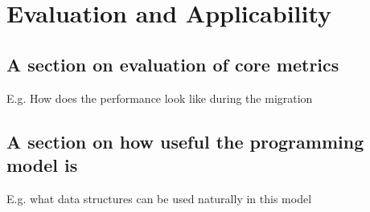 \chapter{Evaluation and Applicability}
\label{chap:evaluation}

\section{A section on evaluation of core metrics}
E.g. How does the performance look like during the migration

\section{A section on how useful the programming model is}
E.g. what data structures can be used naturally in this model

